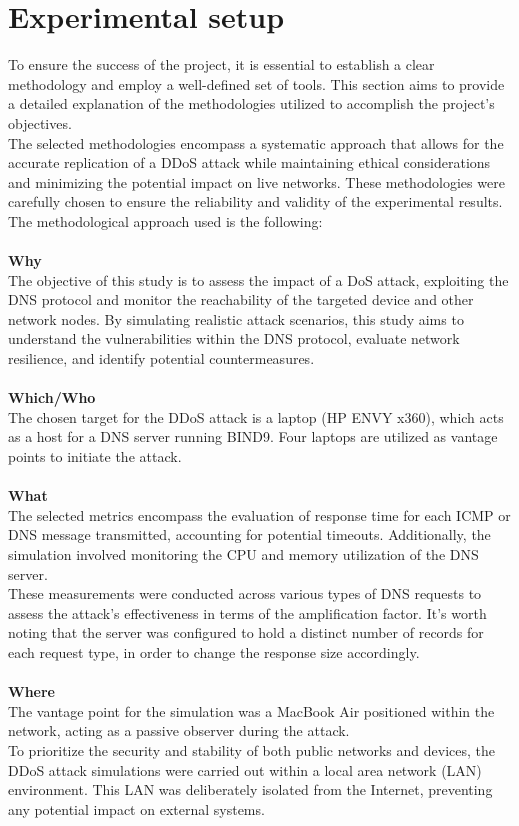 \section{Experimental setup}

To ensure the success of the project, it is essential to establish a clear methodology and employ a well-defined set of tools.
This section aims to provide a detailed explanation of the methodologies utilized to accomplish the project's objectives.\\
The selected methodologies encompass a systematic approach that allows for the accurate replication of a
DDoS attack while maintaining ethical considerations and minimizing the potential impact on live networks.
These methodologies were carefully chosen to ensure the reliability and validity of the experimental results.
The methodological approach used is the following:\\
\\
\textbf{Why}\\
The objective of this study is to assess the impact of a DoS attack, exploiting the DNS protocol and monitor the reachability
of the targeted device and other network nodes.
By simulating realistic attack scenarios, this study aims to understand the vulnerabilities within the DNS protocol, evaluate network resilience,
and identify potential countermeasures.\\
\\
\textbf{Which/Who}\\
The chosen target for the DDoS attack is a laptop (HP ENVY x360), which acts as a host for a DNS server running BIND9.
Four laptops are utilized as vantage points to initiate the attack.\\
\\
\textbf{What}\\
The selected metrics encompass the evaluation of response time for each ICMP or DNS message transmitted, accounting for potential timeouts.
Additionally, the simulation involved monitoring the CPU and memory utilization of the DNS server.\\
These measurements were conducted across various types of DNS requests to assess the attack's effectiveness in terms of the amplification factor.
It's worth noting that the server was configured to hold a distinct number of records for each request type, in order to change the response size accordingly.\\
\\
\textbf{Where}\\
The vantage point for the simulation was a MacBook Air positioned within the network,
acting as a passive observer during the attack.\\
To prioritize the security and stability of both public networks and devices,
the DDoS attack simulations were carried out within a local area network (LAN) environment.
This LAN was deliberately isolated from the Internet, preventing any potential impact on external systems.\\
